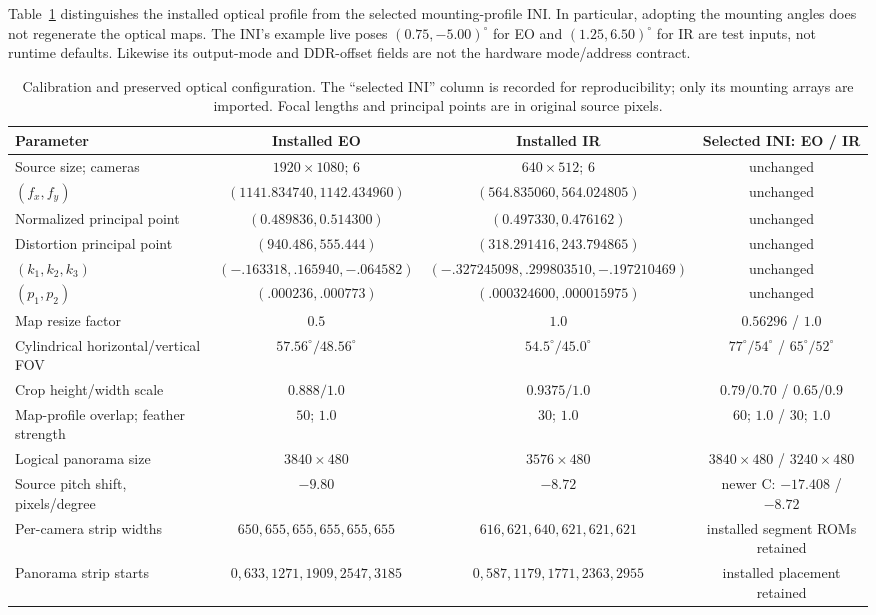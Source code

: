 Table~\ref{tab:gl_calibration} distinguishes the installed optical profile
from the selected mounting-profile INI. In particular, adopting the mounting
angles does not regenerate the optical maps. The INI's example live poses
$(0.75,-5.00)^\circ$ for EO and $(1.25,6.50)^\circ$ for IR are test inputs,
not runtime defaults. Likewise its output-mode and DDR-offset fields are
not the hardware mode/address contract.

\begin{table}[t]
\caption{Calibration and preserved optical configuration. The ``selected INI''
column is recorded for reproducibility; only its mounting arrays are imported.
Focal lengths and principal points are in original source pixels.}
\label{tab:gl_calibration}
\centering\footnotesize\setlength{\tabcolsep}{4.3pt}
\begin{tabular}{@{}lccc@{}}
\toprule
Parameter & Installed EO & Installed IR & Selected INI: EO / IR \\
\midrule
Source size; cameras & $1920\!\times\!1080$; 6 & $640\!\times\!512$; 6 & unchanged \\
$(f_x,f_y)$ & $(1141.834740,1142.434960)$ & $(564.835060,564.024805)$ & unchanged \\
Normalized principal point & $(0.489836,0.514300)$ & $(0.497330,0.476162)$ & unchanged \\
Distortion principal point & $(940.486,555.444)$ & $(318.291416,243.794865)$ & unchanged \\
$(k_1,k_2,k_3)$ & $(-.163318,.165940,-.064582)$ & $(-.327245098,.299803510,-.197210469)$ & unchanged \\
$(p_1,p_2)$ & $(.000236,.000773)$ & $(.000324600,.000015975)$ & unchanged \\
Map resize factor & $0.5$ & $1.0$ & $0.56296$ / $1.0$ \\
Cylindrical horizontal/vertical FOV & $57.56^\circ/48.56^\circ$ & $54.5^\circ/45.0^\circ$ & $77^\circ/54^\circ$ / $65^\circ/52^\circ$ \\
Crop height/width scale & $0.888/1.0$ & $0.9375/1.0$ & $0.79/0.70$ / $0.65/0.9$ \\
Map-profile overlap; feather strength & $50$; $1.0$ & $30$; $1.0$ & $60$; $1.0$ / $30$; $1.0$ \\
Logical panorama size & $3840\!\times\!480$ & $3576\!\times\!480$ & $3840\!\times\!480$ / $3240\!\times\!480$ \\
Source pitch shift, pixels/degree & $-9.80$ & $-8.72$ & newer C: $-17.408$ / $-8.72$ \\
Per-camera strip widths & $650,655,655,655,655,655$ & $616,621,640,621,621,621$ & installed segment ROMs retained \\
Panorama strip starts & $0,633,1271,1909,2547,3185$ & $0,587,1179,1771,2363,2955$ & installed placement retained \\
\bottomrule
\end{tabular}
\end{table}


